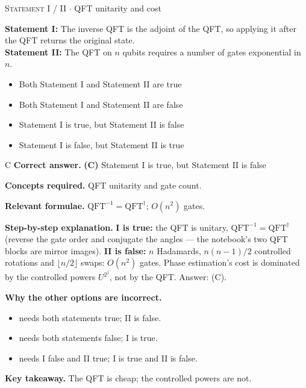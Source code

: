 \documentclass[11pt,a4paper]{article}
\newcommand{\optlabel}[1]{\textbf{(#1)}}
\newcommand{\correctlabel}[1]{\textcolor{okgreen}{\textbf{(#1)}\,\ding{51}}}
\newenvironment{qitem}[1]{\begin{list}{}{\setlength{\leftmargin}{3.3em}\setlength{\labelwidth}{3.1em}%
  \setlength{\labelsep}{0.2em}\setlength{\topsep}{3pt}\setlength{\parsep}{3pt}}\item[\textbf{Q.#1}\hfill]}{\end{list}}
\newcommand{\qsep}{\par\vspace{2pt}{\color{black!15}\hrule}\vspace{4pt}}
\newcommand{\qmeta}[2]{{\footnotesize\color{black!60}\textsc{#1} \;$\cdot$\; #2}\par}
\begin{document}
\begin{qitem}{39}
\qmeta{Statement I / II}{QFT unitarity and cost}
\textbf{Statement I:} The inverse QFT is the adjoint of the QFT, so applying it after the QFT returns the original state.\\[1mm]
\textbf{Statement II:} The QFT on $n$ qubits requires a number of gates exponential in $n$.
\begin{itemize}[leftmargin=2.6em, labelsep=0.4em, itemsep=2pt, topsep=3pt]
\item[\optlabel{A}] Both Statement I and Statement II are true
\item[\optlabel{B}] Both Statement I and Statement II are false
\item[\correctlabel{C}] Statement I is true, but Statement II is false
\item[\optlabel{D}] Statement I is false, but Statement II is true
\end{itemize}
\end{qitem}
\begin{solbox}{C}
\textbf{\color{brand}Correct answer.} \textcolor{okgreen}{\textbf{(C)}} Statement I is true, but Statement II is false

\textbf{\color{brand}Concepts required.} QFT unitarity and gate count.

\textbf{\color{brand}Relevant formulae.} $\mathrm{QFT}^{-1} = \mathrm{QFT}^\dagger$; $O(n^2)$ gates.

\textbf{\color{brand}Step-by-step explanation.} \textbf{I is true:} the QFT is unitary, $\mathrm{QFT}^{-1} = \mathrm{QFT}^\dagger$ (reverse the gate order and conjugate the angles --- the notebook's two QFT blocks are mirror images).
\textbf{II is false:} $n$ Hadamards, $n(n-1)/2$ controlled rotations and $\lfloor n/2\rfloor$ swaps: $O(n^2)$ gates. Phase estimation's cost is dominated by the controlled powers
$U^{2^j}$, not by the QFT. Answer: (C).

\textbf{\color{brand}Why the other options are incorrect.}
\begin{itemize}[leftmargin=2.4em, itemsep=1pt, topsep=2pt]
\item[\textbf{(A)}] needs both statements true; II is false.
\item[\textbf{(B)}] needs both statements false; I is true.
\item[\textbf{(D)}] needs I false and II true; I is true and II is false.
\end{itemize}
\textbf{\color{brand}Key takeaway.} The QFT is cheap; the controlled powers are not.
\end{solbox}
\qsep
\end{document}
